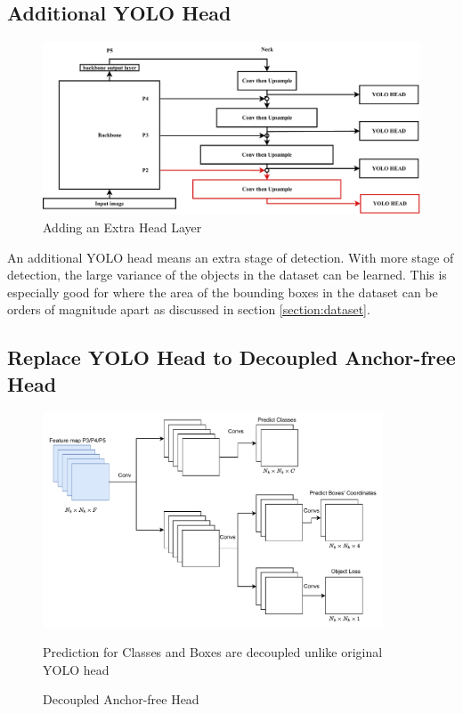  \subsection{Additional YOLO Head}
  \begin{figure}[!t]
    \centering
    \includegraphics[width=.9\textwidth]{figures/addmorehead.pdf}
    \caption{Adding an Extra Head Layer}
    \label{fig:addmorehead}
  \end{figure}
  An additional YOLO head means an extra stage of detection.
  With more stage of detection, the large variance of the objects in the dataset can be learned.
  This is especially good for \textcite{aot_dataset} where the area of the bounding boxes in the dataset
  can be orders of magnitude apart as discussed in section \ref{section:dataset}.
  

  \subsection{Replace YOLO Head to Decoupled Anchor-free Head}
  \begin{figure}[p]
    \centering
    \includegraphics[width=0.9\textwidth]{figures/decoupled-anchorfree.pdf}
    \caption*{Prediction for Classes and Boxes are decoupled unlike original YOLO head}
    \caption{Decoupled Anchor-free Head}
    \label{fig:anchorfree}
  \end{figure}

